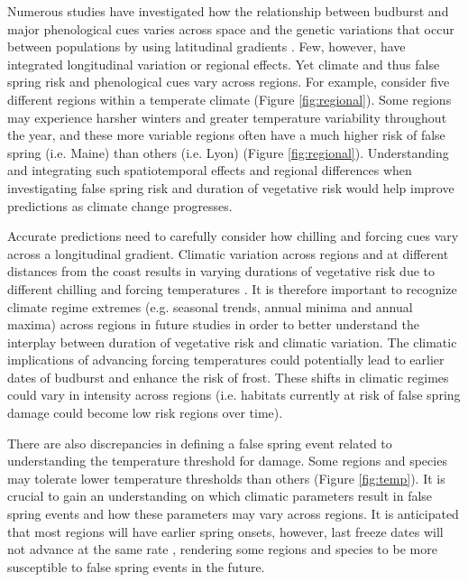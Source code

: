 \documentclass{article}\usepackage[]{graphicx}\usepackage[]{color}
\begin{document}
Numerous studies have investigated how the relationship between budburst and major phenological cues varies across space and the genetic variations that occur between populations by using latitudinal gradients \citep{Partanen2004, Viheraaarnio2006, Caffarra2011, Zohner2016, Gauzere2017}. Few, however, have integrated longitudinal variation or regional effects. Yet climate and thus false spring risk and phenological cues vary across regions. For example, consider five different regions within a temperate climate (Figure \ref{fig:regional}). Some regions may experience harsher winters and greater temperature variability throughout the year, and these more variable regions often have a much higher risk of false spring (i.e. Maine) than others (i.e. Lyon) (Figure \ref{fig:regional}). Understanding and integrating such spatiotemporal effects and regional differences when investigating false spring risk and duration of vegetative risk would help improve predictions as climate change progresses.

Accurate predictions need to carefully consider how chilling and forcing cues vary across a longitudinal gradient. %
Climatic variation across regions and at different distances from the coast results in varying durations of vegetative risk due to different chilling and forcing temperatures \citep{Myking2007}. It is therefore important to recognize climate regime extremes (e.g. seasonal trends, annual minima and annual maxima) across regions in future studies in order to better understand the interplay between duration of vegetative risk and climatic variation. The climatic implications of advancing forcing temperatures could potentially lead to earlier dates of budburst and enhance the risk of frost. These shifts in climatic regimes could vary in intensity across regions (i.e. habitats currently at risk of false spring damage could become low risk regions over time). 

There are also discrepancies in defining a false spring event related to understanding the temperature threshold for damage. Some regions and species may tolerate lower temperature thresholds than others (Figure \ref{fig:temp}). %
It is crucial to gain an understanding on which climatic parameters result in false spring events and how these parameters may vary across regions. It is anticipated that most regions will have earlier spring onsets, however, last freeze dates will not advance at the same rate \citep{Inouye2008,Martin2010,Labe2016,Sgubin2018}, rendering some regions and species to be more susceptible to false spring events in the future. 
\end{document}
